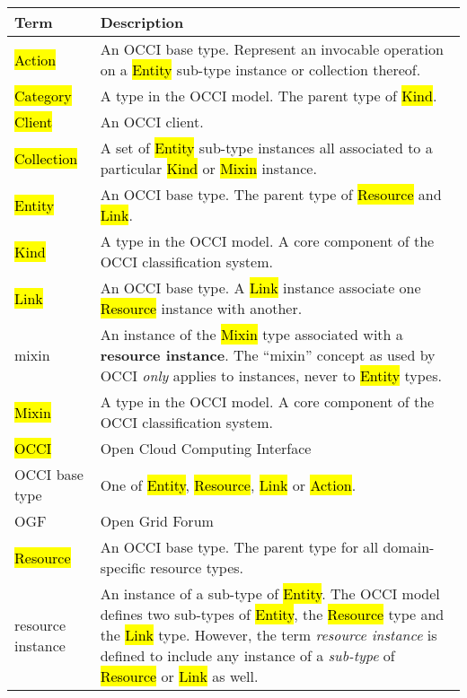 \begin{tabular}{l|p{12cm}}
Term & Description \\
\hline
\hl{Action} & An OCCI base type. Represent an invocable operation on a \hl{Entity} sub-type instance or collection thereof. \\

\hl{Category} & A type in the OCCI model. The parent type of \hl{Kind}. \\

\hl{Client} & An OCCI client.\\

\hl{Collection} & A set of \hl{Entity} sub-type instances all associated to a particular \hl{Kind} or \hl{Mixin} instance. \\

\hl{Entity} & An OCCI base type. The parent type of \hl{Resource} and \hl{Link}. \\

\hl{Kind} & A type in the OCCI model. A core component of the OCCI classification system. \\

\hl{Link} & An OCCI base type. A \hl{Link} instance associate one \hl{Resource} instance with another. \\

mixin & An instance of the \hl{Mixin} type associated with a {\bf resource
 instance}. The ``mixin'' concept as used by OCCI {\em only} applies to
 instances, never to \hl{Entity} types. \\

\hl{Mixin} & A type in the OCCI model. A core component of the OCCI classification system. \\

\hl{OCCI} & Open Cloud Computing Interface \\

OCCI base type & One of \hl{Entity}, \hl{Resource}, \hl{Link} or \hl{Action}. \\

OGF & Open Grid Forum \\

\hl{Resource} & An OCCI base type. The parent type for all domain-specific resource types. \\

resource instance & An instance of a sub-type of \hl{Entity}. The OCCI
 model defines two sub-types of \hl{Entity}, the \hl{Resource} type and the
 \hl{Link} type. However, the term {\em resource instance} is defined to
 include any instance of a {\em sub-type} of \hl{Resource} or \hl{Link} as
 well. \\


\end{tabular}
